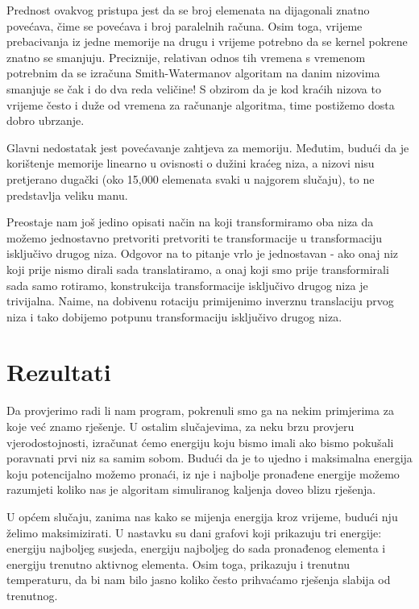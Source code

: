 \documentclass[times, utf8, zavrsni]{fer}
\begin{document}
Prednost ovakvog pristupa jest da se broj elemenata na dijagonali 
znatno povećava, čime se povećava i broj paralelnih računa.
Osim toga, vrijeme prebacivanja iz jedne memorije na drugu
i vrijeme potrebno da se kernel pokrene znatno se smanjuju.
Preciznije, relativan odnos tih vremena s vremenom potrebnim
da se izračuna Smith-Watermanov algoritam na danim nizovima 
smanjuje se čak i do dva reda veličine! S obzirom da je
kod kraćih nizova to vrijeme često i duže od vremena za računanje
algoritma, time postižemo dosta dobro ubrzanje. 

Glavni nedostatak jest povećavanje zahtjeva za memoriju.
Međutim, budući da je korištenje memorije linearno u ovisnosti o
dužini kraćeg niza, a nizovi nisu pretjerano dugački (oko 15,000
elemenata svaki u najgorem slučaju), to ne predstavlja veliku
manu. 

Preostaje nam još jedino opisati način na koji transformiramo
oba niza da možemo jednostavno pretvoriti pretvoriti te transformacije
u transformaciju isključivo drugog niza. Odgovor na to pitanje
vrlo je jednostavan - ako onaj niz koji prije nismo dirali sada
translatiramo, a onaj koji smo prije transformirali sada samo
rotiramo, konstrukcija transformacije isključivo drugog niza
je trivijalna. Naime, na dobivenu rotaciju primijenimo inverznu
translaciju prvog niza i tako dobijemo potpunu transformaciju
isključivo drugog niza.



\chapter{Rezultati}
\label{chapter:Rezultati}

Da provjerimo radi li nam program, pokrenuli smo ga
na nekim primjerima za koje već znamo rješenje. 
U ostalim slučajevima, za neku brzu provjeru vjerodostojnosti,
izračunat ćemo energiju koju bismo imali ako bismo pokušali
poravnati prvi niz sa samim
sobom. Budući da je to ujedno i maksimalna energija koju potencijalno
možemo pronaći, iz nje i najbolje pronađene energije možemo
razumjeti koliko nas je algoritam simuliranog kaljenja doveo
blizu rješenja. 

U općem slučaju, zanima nas kako se mijenja energija kroz vrijeme,
budući nju želimo maksimizirati. U nastavku
su dani grafovi koji prikazuju tri energije: energiju najboljeg
susjeda, energiju najboljeg do sada pronađenog elementa i
energiju trenutno aktivnog elementa. Osim toga, prikazuju i
trenutnu temperaturu, da bi nam bilo jasno koliko često
prihvaćamo rješenja slabija od trenutnog. 
\end{document}
